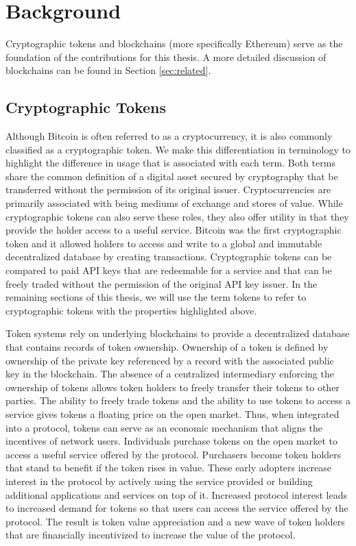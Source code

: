 \section{Background}
\label{sec:background}

Cryptographic tokens and blockchains (more specifically Ethereum) serve as the foundation of the contributions
for this thesis. A more detailed discussion of blockchains can be found in
Section \ref{sec:related}.

\subsection{Cryptographic Tokens}

Although Bitcoin is often referred to as a cryptocurrency, it is also commonly
classified as a cryptographic token. We make this differentiation in terminology
to highlight the difference in usage that is associated with each term. Both
terms share the common definition of a digital asset secured by cryptography that be transferred without
the permission of its original issuer. Cryptocurrencies are primarily associated
with being mediums of exchange and stores of value. While cryptographic tokens
can also serve these roles, they also offer utility in that they provide
the holder access to a useful service. Bitcoin was the first cryptographic token
and it allowed holders to access and write to a global and immutable decentralized
database by creating transactions. Cryptographic tokens can be compared to paid
API keys that are redeemable for a service and that can be freely traded without
the permission of the original API key issuer\cite{balajiTokens}. In the
remaining sections of this thesis, we will use the term tokens to refer to
cryptographic tokens with the properties highlighted above.

Token systems rely on underlying blockchains to provide a decentralized database
that contains records of token ownership. Ownership of a token is defined by
ownership of the private key referenced by a record with the associated public key in the blockchain. The absence of a centralized
intermediary enforcing the ownership of tokens allows token holders to freely
transfer their tokens to other parties. The ability to freely trade tokens and
the ability to use tokens to access a service gives tokens a floating price on
the open market\cite{balajiTokens}. Thus, when integrated into a protocol, tokens can serve as an economic mechanism that aligns the incentives of
network users. Individuals purchase tokens on the open market to access a useful service offered by
the protocol. Purchasers become token holders that stand to benefit if the token rises in
value. These early adopters increase interest in the protocol by actively using
the service provided or building additional applications and services on top of it. Increased
protocol interest leads to increased demand for tokens so that users can access
the service offered by the protocol. The result is token value appreciation
and a new wave of token holders that are financially incentivized to increase
the value of the protocol\cite{fatprotocols}.

